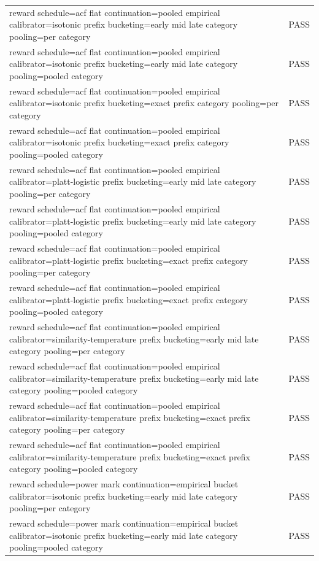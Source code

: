 \begin{table}[h]
\begin{tabular}{ll}
reward schedule=acf flat  continuation=pooled empirical  calibrator=isotonic  prefix bucketing=early mid late  category pooling=per category & PASS \\
reward schedule=acf flat  continuation=pooled empirical  calibrator=isotonic  prefix bucketing=early mid late  category pooling=pooled category & PASS \\
reward schedule=acf flat  continuation=pooled empirical  calibrator=isotonic  prefix bucketing=exact prefix  category pooling=per category & PASS \\
reward schedule=acf flat  continuation=pooled empirical  calibrator=isotonic  prefix bucketing=exact prefix  category pooling=pooled category & PASS \\
reward schedule=acf flat  continuation=pooled empirical  calibrator=platt-logistic  prefix bucketing=early mid late  category pooling=per category & PASS \\
reward schedule=acf flat  continuation=pooled empirical  calibrator=platt-logistic  prefix bucketing=early mid late  category pooling=pooled category & PASS \\
reward schedule=acf flat  continuation=pooled empirical  calibrator=platt-logistic  prefix bucketing=exact prefix  category pooling=per category & PASS \\
reward schedule=acf flat  continuation=pooled empirical  calibrator=platt-logistic  prefix bucketing=exact prefix  category pooling=pooled category & PASS \\
reward schedule=acf flat  continuation=pooled empirical  calibrator=similarity-temperature  prefix bucketing=early mid late  category pooling=per category & PASS \\
reward schedule=acf flat  continuation=pooled empirical  calibrator=similarity-temperature  prefix bucketing=early mid late  category pooling=pooled category & PASS \\
reward schedule=acf flat  continuation=pooled empirical  calibrator=similarity-temperature  prefix bucketing=exact prefix  category pooling=per category & PASS \\
reward schedule=acf flat  continuation=pooled empirical  calibrator=similarity-temperature  prefix bucketing=exact prefix  category pooling=pooled category & PASS \\
reward schedule=power mark  continuation=empirical bucket  calibrator=isotonic  prefix bucketing=early mid late  category pooling=per category & PASS \\
reward schedule=power mark  continuation=empirical bucket  calibrator=isotonic  prefix bucketing=early mid late  category pooling=pooled category & PASS \\

\end{tabular}
\end{table}
